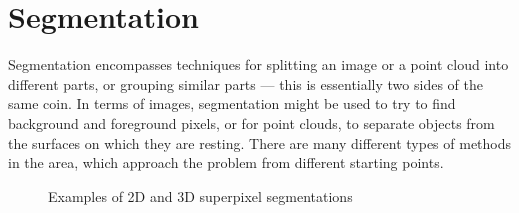 \documentclass[11pt,a4paper]{kth-mag}
\begin{document}
\section{Segmentation}
Segmentation encompasses techniques for splitting an image or a point cloud into
different parts, or grouping similar parts --- this is essentially two sides of
the same coin. In terms of images, segmentation might be used to try to find
background and foreground pixels, or for point clouds, to separate objects from
the surfaces on which they are resting. There are many different types of
methods in the area, which approach the problem from different starting points.

\begin{figure}
  \centerline{
  }
    \caption{Examples of 2D and 3D superpixel segmentations}
    \label{fig:meanshift}
\end{figure}
\end{document}
